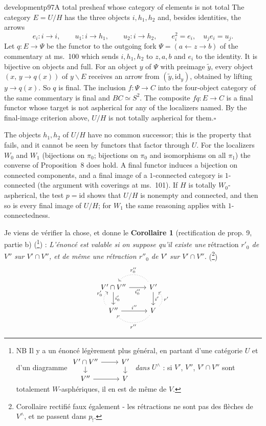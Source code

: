 \begin{dcomment}{development}{p97}{A total presheaf whose category of elements is not total}
The category $E=U/H$ has the three objects $i,h_1,h_2$ and, besides identities, the arrows
\[
 e_i:i\to i,\qquad u_1:i\to h_1,\qquad u_2:i\to h_2,
 \qquad e_i^2=e_i,\quad u_je_i=u_j.
\]
Let $q:E\to\Psi$ be the functor to the outgoing fork $\Psi=(a\leftarrow z\to b)$ of the commentary at ms.~100 which sends $i,h_1,h_2$ to $z,a,b$ and $e_i$ to the identity. It is bijective on objects and full. For an object $y$ of $\Psi$ with preimage $\tilde y$, every object $(x,\,y\to q(x))$ of $y\backslash E$ receives an arrow from $(\tilde y,\mathrm{id}_y)$, obtained by lifting $y\to q(x)$. So $q$ is final. The inclusion $f:\Psi\to C$ into the four-object category of the same commentary is final and $BC\simeq S^2$. The composite $fq:E\to C$ is a final functor whose target is not aspherical for any of the localizers named. By the final-image criterion above, $U/H$ is not totally aspherical for them.\hfill$\square$

The objects $h_1,h_2$ of $U/H$ have no common successor; this is the property that fails, and it cannot be seen by functors that factor through $U$. For the localizers $W_0$ and $W_1$ (bijections on $\pi_0$; bijections on $\pi_0$ and isomorphisms on all $\pi_1$) the converse of Proposition~8 does hold. A final functor induces a bijection on connected components, and a final image of a $1$-connected category is $1$-connected (the argument with coverings at ms.~101). If $H$ is totally $W_0$-aspherical, the test $p=\mathrm{id}$ shows that $U/H$ is nonempty and connected, and then so is every final image of $U/H$; for $W_1$ the same reasoning applies with $1$-connectedness.
\end{dcomment}


Je viens de vérifier la chose, et donne le
\textbf{Corollaire 1} (rectification de prop. 9, partie b) (\footnote{NB Il y a un énoncé légèrement plus général, en partant d'une catégorie $U$ et d'un diagramme
$\begin{tikzcd}[ampersand replacement=\&, row sep=small]
V'\cap V'' \arrow[r] \arrow[d] \& V' \arrow[d] \\
V'' \arrow[r] \& V
\end{tikzcd}$
\textit{dans} $U^\wedge$ : si $V'$, $V''$, $V'\cap V''$ sont totalement $W$-asphériques, il en est de même de $V$.}) : \textit{L'énoncé est valable si on suppose qu'il existe une} rétraction \textit{$r'_0$ de $V''$ sur $V'\cap V''$, et de même une rétraction $r''_0$ de $V'$ sur $V'\cap V''$.} (\footnote{Corollaire rectifié faux également - les rétractions ne sont pas des flèches de $V^\wedge$, et ne passent dans $p_!$.}) %
\[
\begin{tikzcd}
V'\cap V'' \arrow[r, "i''_0"'] \arrow[d, "i'_0"] & V' \arrow[d, "i'"] \arrow[l, dotted, bend right=50, "r''_0"'] \\
V'' \arrow[r, "i''"] \arrow[u, dotted, bend left=50, "r'_0"] & V \arrow[u, dotted, bend right=50, "r'"'] \arrow[l, dotted, bend left=50, "r''"]
\end{tikzcd}
\]

